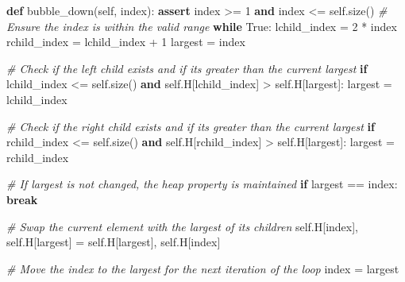 \documentclass[
]{article}
\newenvironment{Shaded}{}{}
\newcommand{\CommentTok}[1]{\textcolor[rgb]{0.38,0.63,0.69}{\textit{#1}}}
\newcommand{\ControlFlowTok}[1]{\textcolor[rgb]{0.00,0.44,0.13}{\textbf{#1}}}
\newcommand{\DecValTok}[1]{\textcolor[rgb]{0.25,0.63,0.44}{#1}}
\newcommand{\KeywordTok}[1]{\textcolor[rgb]{0.00,0.44,0.13}{\textbf{#1}}}
\newcommand{\NormalTok}[1]{#1}
\newcommand{\OperatorTok}[1]{\textcolor[rgb]{0.40,0.40,0.40}{#1}}
\newcommand{\VariableTok}[1]{\textcolor[rgb]{0.10,0.09,0.49}{#1}}
\begin{document}
\begin{Shaded}
\begin{Highlighting}[]
    \KeywordTok{def}\NormalTok{ bubble\_down(}\VariableTok{self}\NormalTok{, index):}
      \ControlFlowTok{assert}\NormalTok{ index }\OperatorTok{\textgreater{}=} \DecValTok{1} \KeywordTok{and}\NormalTok{ index }\OperatorTok{\textless{}=} \VariableTok{self}\NormalTok{.size()  }\CommentTok{\# Ensure the index is within the valid range}
      \ControlFlowTok{while} \VariableTok{True}\NormalTok{:}
\NormalTok{          lchild\_index }\OperatorTok{=} \DecValTok{2} \OperatorTok{*}\NormalTok{ index}
\NormalTok{          rchild\_index }\OperatorTok{=}\NormalTok{ lchild\_index }\OperatorTok{+} \DecValTok{1}
\NormalTok{          largest }\OperatorTok{=}\NormalTok{ index}

          \CommentTok{\# Check if the left child exists and if it\textquotesingle{}s greater than the current largest}
          \ControlFlowTok{if}\NormalTok{ lchild\_index }\OperatorTok{\textless{}=} \VariableTok{self}\NormalTok{.size() }\KeywordTok{and} \VariableTok{self}\NormalTok{.H[lchild\_index] }\OperatorTok{\textgreater{}} \VariableTok{self}\NormalTok{.H[largest]:}
\NormalTok{              largest }\OperatorTok{=}\NormalTok{ lchild\_index}

          \CommentTok{\# Check if the right child exists and if it\textquotesingle{}s greater than the current largest}
          \ControlFlowTok{if}\NormalTok{ rchild\_index }\OperatorTok{\textless{}=} \VariableTok{self}\NormalTok{.size() }\KeywordTok{and} \VariableTok{self}\NormalTok{.H[rchild\_index] }\OperatorTok{\textgreater{}} \VariableTok{self}\NormalTok{.H[largest]:}
\NormalTok{              largest }\OperatorTok{=}\NormalTok{ rchild\_index}

          \CommentTok{\# If largest is not changed, the heap property is maintained}
          \ControlFlowTok{if}\NormalTok{ largest }\OperatorTok{==}\NormalTok{ index:}
              \ControlFlowTok{break}

          \CommentTok{\# Swap the current element with the largest of its children}
          \VariableTok{self}\NormalTok{.H[index], }\VariableTok{self}\NormalTok{.H[largest] }\OperatorTok{=} \VariableTok{self}\NormalTok{.H[largest], }\VariableTok{self}\NormalTok{.H[index]}

          \CommentTok{\# Move the index to the largest for the next iteration of the loop}
\NormalTok{          index }\OperatorTok{=}\NormalTok{ largest}




\end{Highlighting}
\end{Shaded}
\end{document}
